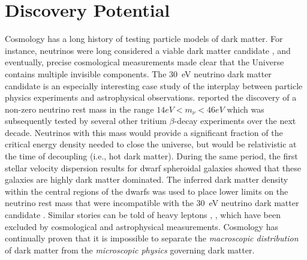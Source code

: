 \chapter{Discovery Potential }
\label{sec:discovery}
\bigskip

Cosmology has a long history of testing particle models of dark matter.
For instance, neutrinos were long considered a viable dark matter candidate \citep[\eg,][]{Kolb:1988}, and eventually, precise cosmological measurements made clear that the Universe contains multiple invisible components.
The 30~eV neutrino dark matter candidate is an especially interesting case study of the interplay between particle physics experiments and astrophysical observations.
\citet{Lyubimov:1980un} reported the discovery of a non-zero neutrino rest mass in the range $14 \unit{eV} < m_{\nu} < 46 \unit{eV}$ which was subsequently tested by several other tritium $\beta$-decay experiments over the next decade.
Neutrinos with this mass would provide a significant fraction of the critical energy density needed to close the universe, but would be relativistic at the time of decoupling (i.e., hot dark matter).
During the same period, the first stellar velocity dispersion results for dwarf spheroidal galaxies showed that these galaxies are highly dark matter dominated.
The inferred dark matter density within the central regions of the dwarfs
was used to place lower limits on the neutrino rest mass that were incompatible with the 30~eV neutrino dark matter candidate \citep{Aaronson:1983,Gerhard:1992}.
Similar stories can be told of heavy leptons \citep{Gunn:1978}, , which have been excluded by cosmological and astrophysical measurements.
Cosmology has continually proven that it is impossible to separate the \emph{macroscopic distribution} of dark matter from the \emph{microscopic physics} governing dark matter.

